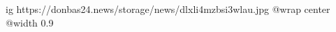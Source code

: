  
 
 
 
 

\ifcmt
  ig https://donbas24.news/storage/news/dlxli4mzbsi3wlau.jpg
  @wrap center
  @width 0.9
\fi
